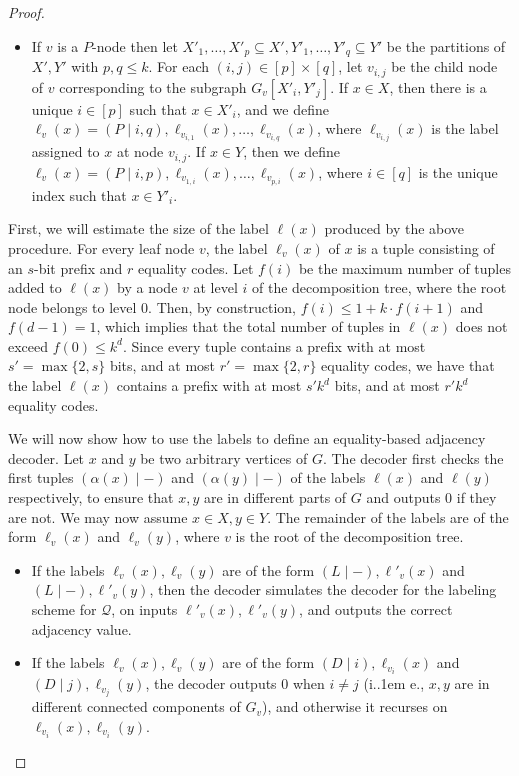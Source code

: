\documentclass{article}
\makeatletter
\newcommand\eqLabelSep{\mathbin|}
\newcommand{\cQ}{\ensuremath{\mathcal{Q}}}
\newcommand*\ie{i.\kern.1em e.\@\xspace} %
\makeatother
\begin{document}
\begin{proof}
\begin{itemize}
\item If $v$ is a $P$-node then let $X'_1, \dotsc, X'_p \subseteq X', Y'_1, \dotsc,
Y'_q \subseteq Y'$ be the partitions of $X',Y'$ with $p,q\le k$. 
For each $(i,j) \in [p]\times[q]$, let $v_{i,j}$ be the child
node of $v$ corresponding to the subgraph $G_v[X'_i,Y'_j]$. 
If $x \in X$, then there is a unique $i \in [p]$ such that $x \in X'_i$, and
we define $\ell_v(x) = (P \eqLabelSep i, q), \ell_{v_{i,1}}(x), \dotsc, \ell_{v_{i,q}}(x)$,
where $\ell_{v_{i,j}}(x)$ is the label assigned to $x$ at node $v_{i,j}$. 
If $x \in Y$, then we define $\ell_v(x) = (P \eqLabelSep i, p), \ell_{v_{1,i}}(x), \dotsc, \ell_{v_{p,i}}(x)$, 
where $i \in [q]$ is the unique index such that $x \in Y'_i$.
\end{itemize}
First, we will estimate the size of the label $\ell(x)$ produced by the above procedure.
For every leaf node $v$, the label $\ell_v(x)$ of $x$ is a tuple consisting of an $s$-bit prefix and $r$ equality codes.
Let $f(i)$ be the maximum number of tuples added to $\ell(x)$ by a node $v$ at level $i$ of the decomposition tree,
where the root node belongs to level $0$.
Then, by construction, $f(i) \leq 1 + k \cdot f(i+1)$ and $f(d-1) = 1$, which implies that the total
number of tuples in $\ell(x)$ does not exceed $f(0) \leq k^d$. 
Since every tuple contains a prefix
with at most $s' = \max\{2, s\}$ bits, and at most $r' = \max\{ 2, r \}$ equality codes, we have that
the label $\ell(x)$ contains a prefix with at most $s' k^d$ bits, and at most $r' k^d$ equality codes.

We will now show how to use the labels to define an equality-based adjacency decoder. 
Let $x$ and $y$ be two arbitrary vertices of $G$. The decoder first checks the first tuples 
$(\alpha(x) \eqLabelSep -)$ and $(\alpha(y) \eqLabelSep -)$ of the labels $\ell(x)$ and $\ell(y)$ respectively, to ensure that
$x,y$ are in different parts of $G$ and outputs 0 if they are not. We may now assume
$x \in X, y \in Y$. The remainder of the labels are of the form $\ell_v(x)$ and $\ell_v(y)$, where
$v$ is the root of the decomposition tree. 
\begin{itemize}
\item If the labels $\ell_v(x),\ell_v(y)$ are of the form $(L \eqLabelSep -), \ell'_v(x)$ and $(L \eqLabelSep -), \ell'_v(y)$, then the decoder simulates the decoder for the labeling scheme for $\cQ$, on inputs
$\ell'_v(x),\ell'_v(y)$, and outputs the correct adjacency value.

\item If the labels $\ell_v(x),\ell_v(y)$ are of the form $(D \eqLabelSep i), \ell_{v_i}(x)$ and
$(D \eqLabelSep j), \ell_{v_j}(y)$, the decoder outputs 0 when $i \neq j$ (\ie, $x,y$ are in different connected
components of $G_v$), and otherwise it recurses on $\ell_{v_i}(x), \ell_{v_i}(y)$.


\end{itemize}
\end{proof}
\end{document}
